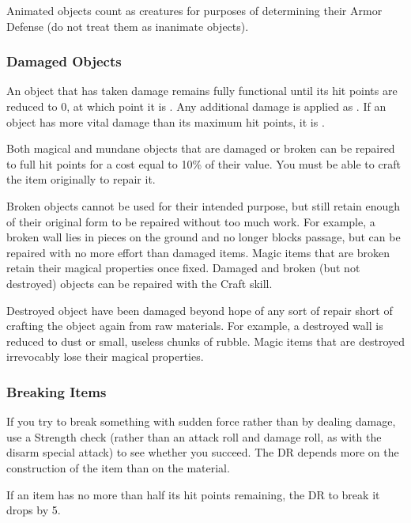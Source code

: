              Animated objects count as creatures for purposes of determining their Armor Defense (do not treat them as inanimate objects).


        \subsubsection{Damaged Objects}
            An object that has taken damage remains fully functional until its hit points are reduced to 0, at which point it is .
            Any additional damage is applied as .
            If an object has more vital damage than its maximum hit points, it is .

            Both magical and mundane objects that are damaged or broken can be repaired to full hit points for a cost equal to 10\% of their value.
            You must be able to craft the item originally to repair it.

            \label{Broken Objects}
            Broken objects cannot be used for their intended purpose, but still retain enough of their original form to be repaired without too much work. For example, a broken wall lies in pieces on the ground and no longer blocks passage, but can be repaired with no more effort than damaged items. Magic items that are broken retain their magical properties once fixed. Damaged and broken (but not destroyed) objects can be repaired with the Craft skill.

            \label{Destroyed Objects}
            Destroyed object have been damaged beyond hope of any sort of repair short of crafting the object again from raw materials.
            For example, a destroyed wall is reduced to dust or small, useless chunks of rubble.
            Magic items that are destroyed irrevocably lose their magical properties.

        \subsubsection{Breaking Items}
            If you try to break something with sudden force rather than by dealing damage, use a Strength check (rather than an attack roll and damage roll, as with the disarm special attack) to see whether you succeed.
            The DR depends more on the construction of the item than on the material.

            If an item has no more than half its hit points remaining, the DR to break it drops by 5.

